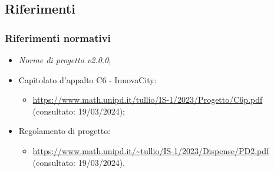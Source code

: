 \subsection{Riferimenti}

\subsubsection{Riferimenti normativi}
\begin{itemize}
    \item \textit{Norme di progetto v2.0.0};
    \item Capitolato d'appalto C6 - InnovaCity:
    \begin{itemize}
        \item \url{https://www.math.unipd.it/tullio/IS-1/2023/Progetto/C6p.pdf} (consultato: 19/03/2024);
    \end{itemize}
    \item Regolamento di progetto:
    \begin{itemize}
        \item \url{https://www.math.unipd.it/~tullio/IS-1/2023/Dispense/PD2.pdf} (consultato: 19/03/2024).
    \end{itemize}
\end{itemize}

